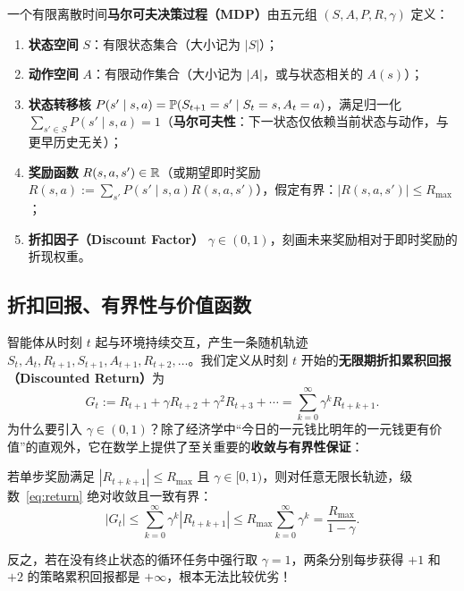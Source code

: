 \begin{defBox}
\begin{definition}\label{def:mdp}
一个有限离散时间\textbf{马尔可夫决策过程（MDP）}由五元组 $(S, A, P, R, \gamma)$ 定义：
\begin{enumerate}
  \item \textbf{状态空间} $S$：有限状态集合（大小记为 $|S|$）；
  \item \textbf{动作空间} $A$：有限动作集合（大小记为 $|A|$，或与状态相关的 $A(s)$）；
  \item \textbf{状态转移核} $P(s' \mid s, a) = \mathbb{P}(S_{t+1} = s' \mid S_t = s, A_t = a)$，满足归一化 $\sum_{s'\in S} P(s'\mid s, a) = 1$（\textbf{马尔可夫性}：下一状态仅依赖当前状态与动作，与更早历史无关）；
  \item \textbf{奖励函数} $R(s, a, s') \in \mathbb{R}$（或期望即时奖励 $R(s, a) := \sum_{s'} P(s'\mid s, a) R(s, a, s')$），假定有界：$|R(s, a, s')| \le R_{\max}$；
  \item \textbf{折扣因子（Discount Factor）} $\gamma \in (0, 1)$，刻画未来奖励相对于即时奖励的折现权重。
\end{enumerate}
\end{definition}
\end{defBox}

\subsection{折扣回报、有界性与价值函数}

智能体从时刻 $t$ 起与环境持续交互，产生一条随机轨迹 $S_t, A_t, R_{t+1}, S_{t+1}, A_{t+1}, R_{t+2}, \dots$。我们定义从时刻 $t$ 开始的\textbf{无限期折扣累积回报（Discounted Return）}为
\begin{equation}\label{eq:return}
  G_t := R_{t+1} + \gamma R_{t+2} + \gamma^2 R_{t+3} + \cdots = \sum_{k=0}^{\infty} \gamma^k R_{t+k+1}.
\end{equation}
为什么要引入 $\gamma \in (0, 1)$？除了经济学中“今日的一元钱比明年的一元钱更有价值”的直观外，它在数学上提供了至关重要的\textbf{收敛与有界性保证}：

\begin{proposition}[折扣回报的一致有界性]\label{prop:return-bound}
若单步奖励满足 $|R_{t+k+1}| \le R_{\max}$ 且 $\gamma \in [0, 1)$，则对任意无限长轨迹，级数~\eqref{eq:return} 绝对收敛且一致有界：
\[
  |G_t| \le \sum_{k=0}^{\infty} \gamma^k |R_{t+k+1}| \le R_{\max} \sum_{k=0}^{\infty} \gamma^k = \frac{R_{\max}}{1 - \gamma}.
\]
\end{proposition}
反之，若在没有终止状态的循环任务中强行取 $\gamma = 1$，两条分别每步获得 $+1$ 和 $+2$ 的策略累积回报都是 $+\infty$，根本无法比较优劣！

